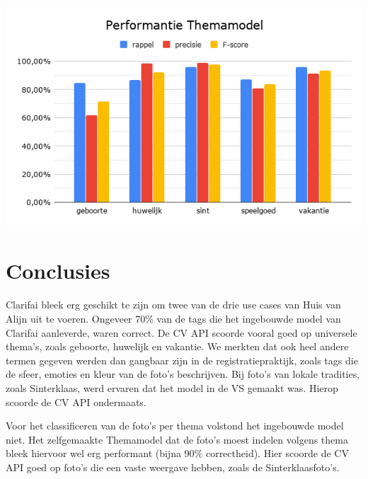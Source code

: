 \documentclass[a0,portrait]{a0poster}
\begin{document}
\begin{multicols}{2}
\begin{center}\vspace{1cm}
	\includegraphics[width=1.0\linewidth]{performantie_themamodel}
\end{center}\vspace{1cm}


\color{HoGentAccent1} 
\section*{Conclusies}
\color{black}
Clarifai bleek erg geschikt te zijn om twee van de drie use cases van Huis van Alijn uit te voeren. Ongeveer 70\% van de tags die het ingebouwde model van Clarifai aanleverde, waren correct. De CV API scoorde vooral goed op universele thema's, zoals geboorte, huwelijk en vakantie. We merkten dat ook heel andere termen gegeven werden dan gangbaar zijn in de registratiepraktijk, zoals tags die de sfeer, emoties en kleur van de foto's beschrijven. Bij foto's van lokale tradities, zoals Sinterklaas, werd ervaren dat het model in de VS gemaakt was. Hierop scoorde de CV API ondermaats. 

Voor het classificeren van de foto’s per thema volstond het ingebouwde model niet. Het zelfgemaakte Themamodel dat de foto's moest indelen volgens thema bleek hiervoor wel erg performant (bijna 90\% correctheid). Hier scoorde de CV API goed op foto's die een vaste weergave hebben, zoals de Sinterklaasfoto's. 


\end{multicols}
\end{document}
